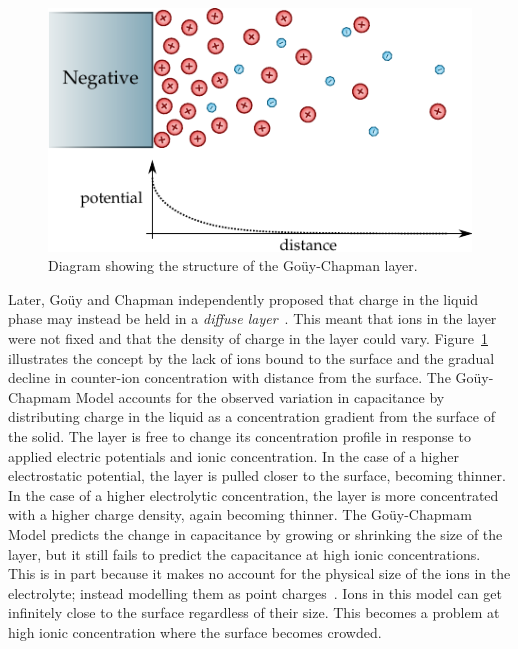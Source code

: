     \begin{figure}
      \begin{center}
        \includegraphics{content/introduction/graphics/model_guoyChapman}
      \end{center}
      \caption{Diagram showing the structure of the Goüy-Chapman layer.}
      \label{fig:doubleLayerModel_gouyChapman}
    \end{figure}
    Later, Goüy and Chapman independently proposed that charge in the liquid phase may instead be held in a \emph{diffuse layer}~\cite{Chapman1913}.
    This meant that ions in the layer were not fixed and that the density of charge in the layer could vary.
    Figure~\ref{fig:doubleLayerModel_gouyChapman} illustrates the concept by the lack of ions bound to the surface and the gradual decline in counter-ion concentration with distance from the surface.
    The Goüy-Chapmam Model accounts for the observed variation in capacitance by distributing charge in the liquid as a concentration gradient from the surface of the solid.
    The layer is free to change its concentration profile in response to applied electric potentials and ionic concentration.
    In the case of a higher electrostatic potential, the layer is pulled closer to the surface, becoming thinner.
    In the case of a higher electrolytic concentration, the layer is more concentrated with a higher charge density, again becoming thinner.
    The Goüy-Chapmam Model predicts the change in capacitance by growing or shrinking the size of the layer, but it still fails to predict the capacitance at high ionic concentrations.
    This is in part because it makes no account for the physical size of the ions in the electrolyte; instead modelling them as point charges~\cite{Bard1980}.
    Ions in this model can get infinitely close to the surface regardless of their size.
    This becomes a problem at high ionic concentration where the surface becomes crowded.

